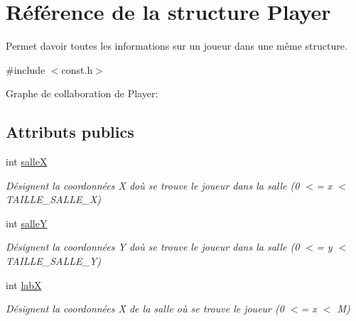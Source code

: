 \hypertarget{structPlayer}{}\section{Référence de la structure Player}
\label{structPlayer}


Permet d\textquotesingle{}avoir toutes les informations sur un joueur dans une même structure.  




{\ttfamily \#include $<$const.\+h$>$}



Graphe de collaboration de Player\+:
\subsection*{Attributs publics}
\begin{DoxyCompactItemize}
\item 
\mbox{\label{structPlayer_a2a50d7c1115b49a3f47fc43ac1f270d2}} 
int \hyperlink{structPlayer_a2a50d7c1115b49a3f47fc43ac1f270d2}{salleX}
\begin{DoxyCompactList}\small\item\em Désignent la coordonnées X d\textquotesingle{}où se trouve le joueur dans la salle (0 $<$= x $<$ T\+A\+I\+L\+L\+E\+\_\+\+S\+A\+L\+L\+E\+\_\+X) \end{DoxyCompactList}\item 
\mbox{\label{structPlayer_ac7eddcb38ddaeee5e42f4a8d0069e141}} 
int \hyperlink{structPlayer_ac7eddcb38ddaeee5e42f4a8d0069e141}{salleY}
\begin{DoxyCompactList}\small\item\em Désignent la coordonnées Y d\textquotesingle{}où se trouve le joueur dans la salle (0 $<$= y $<$ T\+A\+I\+L\+L\+E\+\_\+\+S\+A\+L\+L\+E\+\_\+Y) \end{DoxyCompactList}\item 
\mbox{\label{structPlayer_ad5ee8590390fbd78e4980c1417636def}} 
int \hyperlink{structPlayer_ad5ee8590390fbd78e4980c1417636def}{labX}
\begin{DoxyCompactList}\small\item\em Désignent la coordonnées X de la salle où se trouve le joueur (0 $<$= x $<$ M) \end{DoxyCompactList}\item 
\mbox{\label{structPlayer_a4493a9445fdae1062e5fc0485010e3d8}} 

\end{DoxyCompactItemize}
